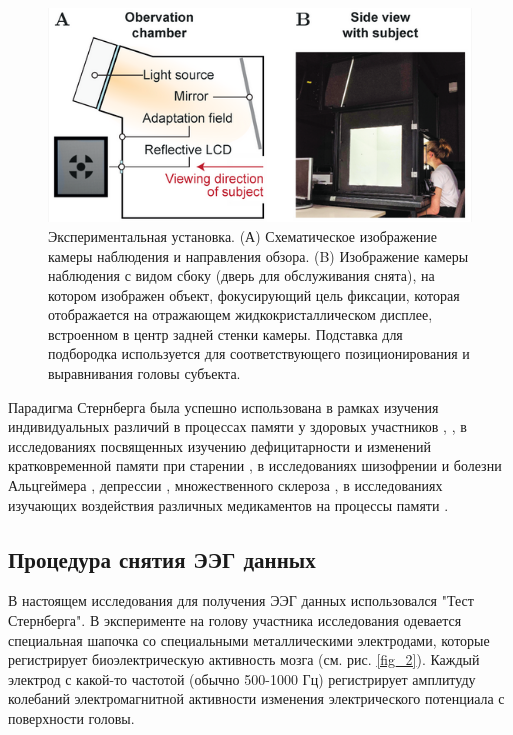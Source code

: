 \begin{figure}[H]
    \centering
    \includegraphics[width=0.6\linewidth]{images/1.png}
    \caption{Экспериментальная установка. (А) Схематическое изображение камеры наблюдения и
    направления обзора. (B) Изображение камеры наблюдения с видом сбоку (дверь для
    обслуживания снята), на котором изображен объект, фокусирующий цель фиксации, которая
    отображается на отражающем жидкокристаллическом дисплее, встроенном в центр задней стенки
    камеры. Подставка для подбородка используется для соответствующего позиционирования и
    выравнивания головы субъекта.\cite{sternberg_paradigm}}
    \label{fig_1}
\end{figure}

Парадигма Стернберга была успешно использована в рамках изучения индивидуальных различий в
процессах памяти у здоровых участников \cite{paradigm_1}, \cite{paradigm_2}, в
исследованиях посвященных изучению дефицитарности и изменений кратковременной памяти при
старении \cite{paradigm_3}, в исследованиях шизофрении и болезни
Альцгеймера \cite{paradigm_4}, депрессии \cite{paradigm_5}, множественного склероза \cite{paradigm_6}, в
исследованиях изучающих воздействия различных медикаментов на процессы памяти \cite{paradigm_7}.\\[0.5 cm]

\subsection{Процедура снятия ЭЭГ данных}
\label{sec:chapter_2_2}

\vspace*{10 mm}
В настоящем исследования для получения ЭЭГ данных использовался "Тест Стернберга".
В эксперименте на голову участника исследования одевается специальная шапочка со специальными
металлическими электродами, которые регистрирует биоэлектрическую активность мозга (см. рис.
\ref{fig_2}). Каждый электрод с какой-то частотой (обычно 500-1000 Гц) регистрирует амплитуду
колебаний электромагнитной активности изменения электрического потенциала с поверхности головы. 

